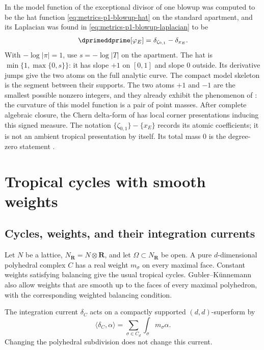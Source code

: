 \begin{example}
\label{ex:ch18-p1-blowup-defect}
In  the model function of the exceptional divisor
of one blowup was computed to be the hat function
\eqref{eq:metrics-p1-blowup-hat} on the standard apartment, and its
Laplacian was found in \eqref{eq:metrics-p1-blowup-laplacian} to be
\[
 \dprimeddprime[\varphi_E]=\delta_{\zeta_{0,1}}-\delta_{x_E}.
\]
With $-\log|\pi|=1$, use $s=-\log|T|$ on the apartment.  The hat is
$\min\{1,\max\{0,s\}\}$: it has slope $+1$ on $[0,1]$ and slope $0$
outside.  Its derivative jumps give the two atoms on the full analytic
curve.  The compact model skeleton is the segment between their supports.
The two atoms $+1$ and $-1$ are the smallest possible nonzero integers, and
they already exhibit the phenomenon of : the
curvature of this model function is a pair of point masses.  After complete
algebraic closure, the Chern delta-form of
 has local corner presentations inducing this
signed measure.  The notation
$\{\zeta_{0,1}\}-\{x_E\}$ records its atomic coefficients; it is not an
ambient tropical presentation by itself.  Its total mass $0$ is the
degree-zero statement .
\end{example}

\section{Tropical cycles with smooth weights}
\label{sec:delta-tropical}

\subsection{Cycles, weights, and their integration currents}
\label{sec:ch18-cycles-weights}

Let $N$ be a lattice, $N_{\mathbf R}=N\otimes\mathbf R$, and let
$\Omega\subset N_{\mathbf R}$ be open.  A pure $d$-dimensional
polyhedral complex $C$ has a real weight $m_\sigma$ on every maximal
face.  Constant weights satisfying balancing give the usual tropical
cycles.  Gubler--K\"unnemann
also allow weights that are smooth up to the faces of every maximal
polyhedron, with the corresponding weighted balancing condition.

The integration current $\delta_C$ acts on a compactly supported
$(d,d)$-superform by
\[
                \langle\delta_C,\alpha\rangle
                  =\sum_{\sigma\in C_d}
                     \int_\sigma m_\sigma\alpha.
\]
Changing the polyhedral subdivision does not change this current.

